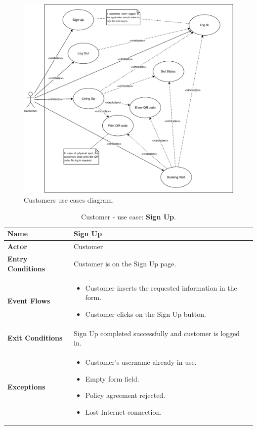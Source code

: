 \begin{figure}[H]
	\centering

	\includegraphics[width=1.0\textwidth]{images/customers_use_cases_diagram.pdf}
	\caption{Customers use cases diagram.}
	\label{customersUseCasesDiagram}
\end{figure}

\begin{table}[h!]
\centering
\begin{tabular}{| m{} | m{} |} 
	\hline
	\textbf{Name} & Sign Up \\ 
	\hline
	\textbf{Actor} & Customer \\ 
	\hline
	\textbf{Entry Conditions} & Customer is on the Sign Up page. \\ 
	\hline
	\textbf{Event Flows} &
	\begin{itemize}
		\item Customer inserts the requested information in the form.
		\item Customer clicks on the Sign Up button.
	\end{itemize} \\ 
	\hline
	\textbf{Exit Conditions} & Sign Up completed successfully and customer is logged in. \\ 
	\hline
	\textbf{Exceptions} &
	\begin{itemize}
		\item Customer's username already in use.
		\item Empty form field.
		\item Policy agreement rejected.
		\item Lost Internet connection.
	\end{itemize} \\ 
	\hline
\end{tabular}
\caption{Customer - use case: \textbf{Sign Up}.}
\label{tableSignUp}
\end{table}

